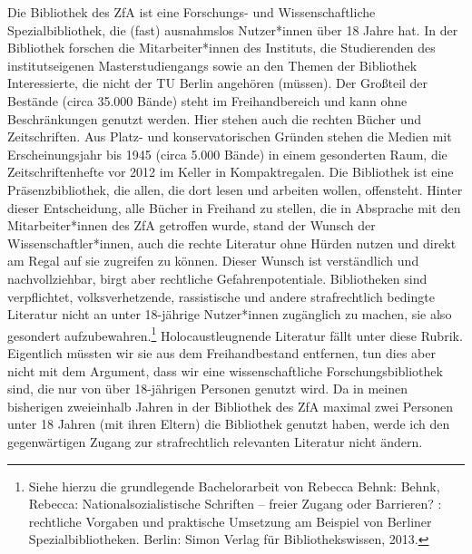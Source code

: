 \documentclass[a4paper,
fontsize=11pt,
oneside,
numbers=noperiodatend,
parskip=half-,
bibliography=totoc,
final
]{scrartcl}
\begin{document}
Die Bibliothek des ZfA ist eine Forschungs- und Wissenschaftliche
Spezialbibliothek, die (fast) ausnahmslos Nutzer*innen über 18 Jahre
hat. In der Bibliothek forschen die Mitarbeiter*innen des Instituts, die
Studierenden des institutseigenen Masterstudiengangs sowie an den Themen
der Bibliothek Interessierte, die nicht der TU Berlin angehören
(müssen). Der Großteil der Bestände (circa 35.000 Bände) steht im
Freihandbereich und kann ohne Beschränkungen genutzt werden. Hier stehen
auch die rechten Bücher und Zeitschriften. Aus Platz- und
konservatorischen Gründen stehen die Medien mit Erscheinungsjahr bis
1945 (circa 5.000 Bände) in einem gesonderten Raum, die
Zeitschriftenhefte vor 2012 im Keller in Kompaktregalen. Die Bibliothek
ist eine Präsenzbibliothek, die allen, die dort lesen und arbeiten
wollen, offensteht. Hinter dieser Entscheidung, alle Bücher in Freihand
zu stellen, die in Absprache mit den Mitarbeiter*innen des ZfA getroffen
wurde, stand der Wunsch der Wissenschaftler*innen, auch die rechte
Literatur ohne Hürden nutzen und direkt am Regal auf sie zugreifen zu
können. Dieser Wunsch ist verständlich und nachvollziehbar, birgt aber
rechtliche Gefahrenpotentiale. Bibliotheken sind verpflichtet,
volksverhetzende, rassistische und andere strafrechtlich bedingte
Literatur nicht an unter 18-jährige Nutzer*innen zugänglich zu machen,
sie also gesondert aufzubewahren.\footnote{Siehe hierzu die grundlegende
  Bachelorarbeit von Rebecca Behnk: Behnk, Rebecca:
  Nationalsozialistische Schriften -- freier Zugang oder Barrieren? :
  rechtliche Vorgaben und praktische Umsetzung am Beispiel von Berliner
  Spezialbibliotheken. Berlin: Simon Verlag für Bibliothekswissen, 2013.}
Holocaustleugnende Literatur fällt unter diese Rubrik. Eigentlich
müssten wir sie aus dem Freihandbestand entfernen, tun dies aber nicht
mit dem Argument, dass wir eine wissenschaftliche Forschungsbibliothek
sind, die nur von über 18-jährigen Personen genutzt wird. Da in meinen
bisherigen zweieinhalb Jahren in der Bibliothek des ZfA maximal zwei
Personen unter 18 Jahren (mit ihren Eltern) die Bibliothek genutzt
haben, werde ich den gegenwärtigen Zugang zur strafrechtlich relevanten
Literatur nicht ändern.
\end{document}
